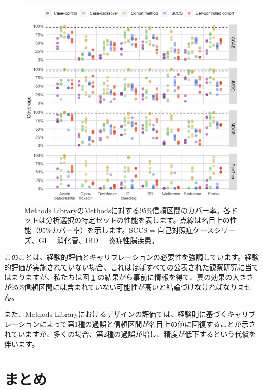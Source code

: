 \documentclass[
  11pt]{book}
\theoremstyle{definition}
\theoremstyle{definition}
\theoremstyle{definition}
\theoremstyle{definition}
\theoremstyle{remark}
\begin{document}
\begin{figure}[h]

{\centering \includegraphics[width=1\linewidth]{images/MethodValidity/methodEval} 

}

\caption{Methods LibraryのMethodsに対する95\%信頼区間のカバー率。各ドットは分析選択の特定セットの性能を表します。点線は名目上の性能（95\%カバー率）を示します。SCCS = 自己対照症ケースシリーズ、GI = 消化管、IBD = 炎症性腸疾患。}\label{fig:methodEval}
\end{figure}

このことは、経験的評価とキャリブレーションの必要性を強調しています。経験的評価が実施されていない場合、これはほぼすべての公表された観察研究に当てはまりますが、私たちは図 \ref{fig:methodEval} の結果から事前に情報を得て、真の効果の大きさが95\%信頼区間には含まれていない可能性が高いと結論づけなければなりません。

また、Methods Libraryにおけるデザインの評価では、経験則に基づくキャリブレーションによって第1種の過誤と信頼区間が名目上の値に回復することが示されていますが、多くの場合、第2種の過誤が増し、精度が低下するという代償を伴います。

\section{まとめ}\label{ux307eux3068ux3081-15}
\end{document}
